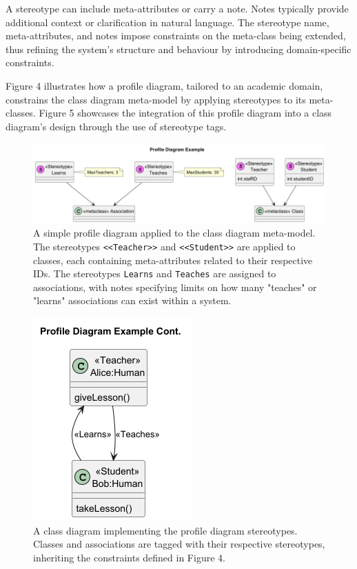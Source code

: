 \documentclass{article}
\begin{document}
{A stereotype can include meta-attributes or carry a note. Notes typically provide additional context or clarification in natural language. The stereotype name, meta-attributes, and notes impose constraints on the meta-class being extended, thus refining the system's structure and behaviour by introducing domain-specific constraints\cite{Seidl_Scholz_Huemer_Kappel_Duffy_2014}. 

Figure 4 illustrates how a profile diagram, tailored to an academic domain, constrains the class diagram meta-model by applying stereotypes to its meta-classes. Figure 5 showcases the integration of this profile diagram into a class diagram's design through the use of stereotype tags.

\begin{figure}[H]
    \centering
    \includegraphics[width=1\linewidth]{PDExample-Profile_Diagram_Example.png}
    \caption{A simple profile diagram applied to the class diagram meta-model. The stereotypes \texttt{<<Teacher>>} and \texttt{<<Student>>} are applied to classes, each containing meta-attributes related to their respective IDs. The stereotypes \texttt{Learns} and \texttt{Teaches} are assigned to associations, with notes specifying limits on how many "teaches" or "learns" associations can exist within a system.}
    \label{fig:Simple PD 1}
\end{figure}

\begin{figure}[H]
    \centering
    \includegraphics[width=0.3\linewidth]{PDExample2.png}
    \caption{A class diagram implementing the profile diagram stereotypes. Classes and associations are tagged with their respective stereotypes, inheriting the constraints defined in Figure 4.}
    \label{fig:Simple PD 2}
\end{figure}

}
\end{document}
